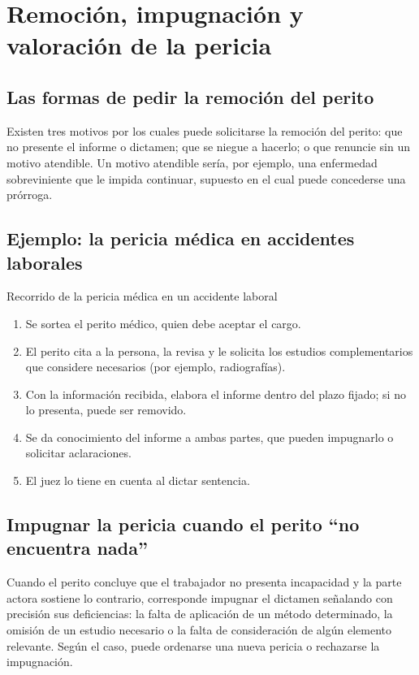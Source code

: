 \documentclass[12pt,oneside]{book}
\begin{document}
\section{Remoción, impugnación y valoración de la pericia}

\subsection{Las formas de pedir la remoción del perito}

Existen tres motivos por los cuales puede solicitarse la remoción del perito: que no presente el informe o dictamen; que se niegue a hacerlo; o que renuncie sin un motivo atendible. Un motivo atendible sería, por ejemplo, una enfermedad sobreviniente que le impida continuar, supuesto en el cual puede concederse una prórroga.

\subsection{Ejemplo: la pericia médica en accidentes laborales}

\begin{example}{Recorrido de la pericia médica en un accidente laboral}
\begin{enumerate}
\item Se sortea el perito médico, quien debe aceptar el cargo.
\item El perito cita a la persona, la revisa y le solicita los estudios complementarios que considere necesarios (por ejemplo, radiografías).
\item Con la información recibida, elabora el informe dentro del plazo fijado; si no lo presenta, puede ser removido.
\item Se da conocimiento del informe a ambas partes, que pueden impugnarlo o solicitar aclaraciones.
\item El juez lo tiene en cuenta al dictar sentencia.
\end{enumerate}
\end{example}

\subsection{Impugnar la pericia cuando el perito ``no encuentra nada''}

Cuando el perito concluye que el trabajador no presenta incapacidad y la parte actora sostiene lo contrario, corresponde impugnar el dictamen señalando con precisión sus deficiencias: la falta de aplicación de un método determinado, la omisión de un estudio necesario o la falta de consideración de algún elemento relevante. Según el caso, puede ordenarse una nueva pericia o rechazarse la impugnación.
\end{document}
